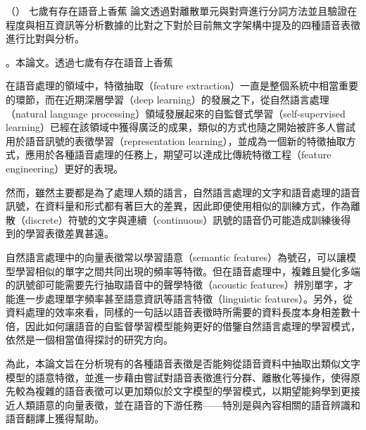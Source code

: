 

        （）
七歲有存在語音上香蕉
        論文透過對離散單元與對齊進行分詞方法並且驗證在程度與相互資訊等分析數據的比對之下對於目前無文字架構中提及的四種語音表徵進行比對與分析。

        。本論文。透過七歲有存在語音上香蕉


        在語音處理的領域中，特徵抽取（feature extraction）一直是整個系統中相當重要的環節，而在近期深層學習（deep learning）的發展之下，從自然語言處理（natural language processing）領域發展起來的自監督式學習（self-supervised learning）已經在該領域中獲得廣泛的成果，類似的方式也隨之開始被許多人嘗試用於語音訊號的表徵學習（representation learning），並成為一個新的特徵抽取方式，應用於各種語音處理的任務上，期望可以達成比傳統特徵工程（feature engineering）更好的表現。

        然而，雖然主要都是為了處理人類的語言，自然語言處理的文字和語音處理的語音訊號，在資料量和形式都有著巨大的差異，因此即便使用相似的訓練方式，作為離散（discrete）符號的文字與連續（continuous）訊號的語音仍可能造成訓練後得到的學習表徵差異甚遠。

        自然語言處理中的向量表徵常以學習語意（semantic features）為號召，可以讓模型學習相似的單字之間共同出現的頻率等特徵。但在語音處理中，複雜且變化多端的訊號卻可能需要先行抽取語音中的聲學特徵（acoustic features）辨別單字，才能進一步處理單字頻率甚至語意資訊等語言特徵（linguistic features）。另外，從資料處理的效率來看，同樣的一句話以語音表徵時所需要的資料長度本身相差數十倍，因此如何讓語音的自監督學習模型能夠更好的借鑒自然語言處理的學習模式，依然是一個相當值得探討的研究方向。

        為此，本論文旨在分析現有的各種語音表徵是否能夠從語音資料中抽取出類似文字模型的語意特徵，並進一步藉由嘗試對語音表徵進行分群、離散化等操作，使得原先較為複雜的語音表徵可以更加類似於文字模型的學習模式，以期望能夠學到更接近人類語意的向量表徵，並在語音的下游任務——特別是與內容相關的語音辨識和語音翻譯上獲得幫助。


